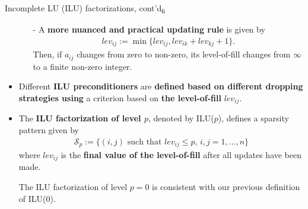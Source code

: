 \documentclass[t,usepdftitle=false]{beamer}
\begin{document}
\begin{frame}{Incomplete LU (ILU) factorizations, cont'd\textsubscript{6}}
\begin{itemize}
\item[]
\begin{itemize}\normalsize
\item[-] A \textbf{more nuanced and practical updating rule} is given by
\begin{align}\label{eq:lev-update}
lev_{ij}:=\min\{lev_{ij},lev_{ik}+lev_{kj}+1\}.
\end{align}
Then, if $a_{ij}$ changes from zero to non-zero, its level-of-fill changes from $\infty$ to a finite non-zero integer.
\end{itemize}
\item Different \textbf{ILU preconditioners} are \textbf{defined based on different dropping strategies using} a criterion based on \textbf{the level-of-fill} $lev_{ij}$.
\item The \textbf{ILU factorization of level $p$}, denoted by ILU($p$), defines a sparsity pattern given by
\begin{align*}
\mathcal{S}_p:=\{(i,j)\text{ such that }lev_{ij}\leq p,\,i,j=1,\dots,n\}
\end{align*}
where $lev_{ij}$ is the \textbf{final value of the level-of-fill} after all updates have been made.
\item[] The ILU factorization of level $p=0$ is consistent with our previous definition of ILU(0).
\end{itemize}
\end{frame}
\end{document}
